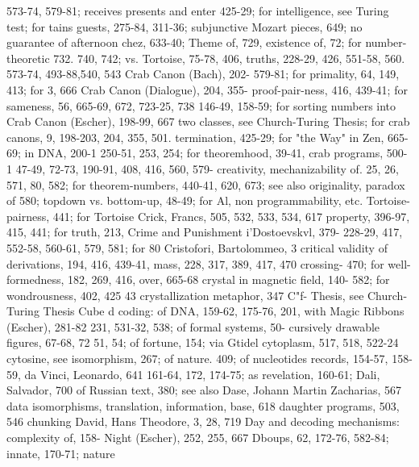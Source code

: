 573-74, 579-81; receives presents and enter    425-29; for intelligence, see Turing test; for
tains guests, 275-84, 311-36; subjunctive      Mozart pieces, 649; no guarantee of
afternoon chez, 633-40; Theme of, 729,         existence of, 72; for number-theoretic
732. 740, 742; vs. Tortoise, 75-78, 406,       truths, 228-29, 426, 551-58, 560. 573-74,
493-88,540, 543 Crab Canon (Bach), 202-        579-81; for primality, 64, 149, 413; for
3, 666 Crab Canon (Dialogue), 204, 355-        proof-pair-ness, 416, 439-41; for sameness,
56, 665-69, 672, 723-25, 738                   146-49, 158-59; for sorting numbers into
Crab Canon (Escher), 198-99, 667               two classes, see Church-Turing Thesis; for
crab canons, 9, 198-203, 204, 355, 501.        termination, 425-29; for "the Way" in Zen,
665-69; in DNA, 200-1                          250-51, 253, 254; for theoremhood, 39-41,
crab programs, 500-1                           47-49, 72-73, 190-91, 408, 416, 560, 579-
creativity, mechanizability of. 25, 26, 571,   80, 582; for theorem-numbers, 440-41,
620, 673; see also originality, paradox of     580; topdown vs. bottom-up, 48-49; for
Al, non programmability, etc.                  Tortoise-pairness, 441; for Tortoise
Crick, Francs, 505, 532, 533, 534, 617         property, 396-97, 415, 441; for truth, 213,
Crime and Punishment i'Dostoevskvl, 379-       228-29, 417, 552-58, 560-61, 579, 581; for
80 Cristofori, Bartolommeo, 3 critical         validity of derivations, 194, 416, 439-41,
mass, 228, 317, 389, 417, 470 crossing-        470; for well-formedness, 182, 269, 416,
over, 665-68 crystal in magnetic field, 140-   582; for wondrousness, 402, 425
43 crystallization metaphor, 347 C"f-
Thesis, see Church-Turing Thesis Cube          d coding: of DNA, 159-62, 175-76, 201,
with Magic Ribbons (Escher), 281-82            231, 531-32, 538; of formal systems, 50-
cursively drawable figures, 67-68, 72          51, 54; of fortune, 154; via Gtidel
cytoplasm, 517, 518, 522-24 cytosine, see      isomorphism, 267; of nature. 409; of
nucleotides                                    records, 154-57, 158-59,
da Vinci, Leonardo, 641                        161-64, 172, 174-75; as revelation, 160-61;
Dali, Salvador, 700                            of Russian text, 380; see also
Dase, Johann Martin Zacharias, 567 data        isomorphisms, translation, information,
base, 618 daughter programs, 503, 546          chunking
David, Hans Theodore, 3, 28, 719 Day and       decoding mechanisms: complexity of, 158-
Night (Escher), 252, 255, 667 Dboups,          62, 172-76, 582-84; innate, 170-71; nature
